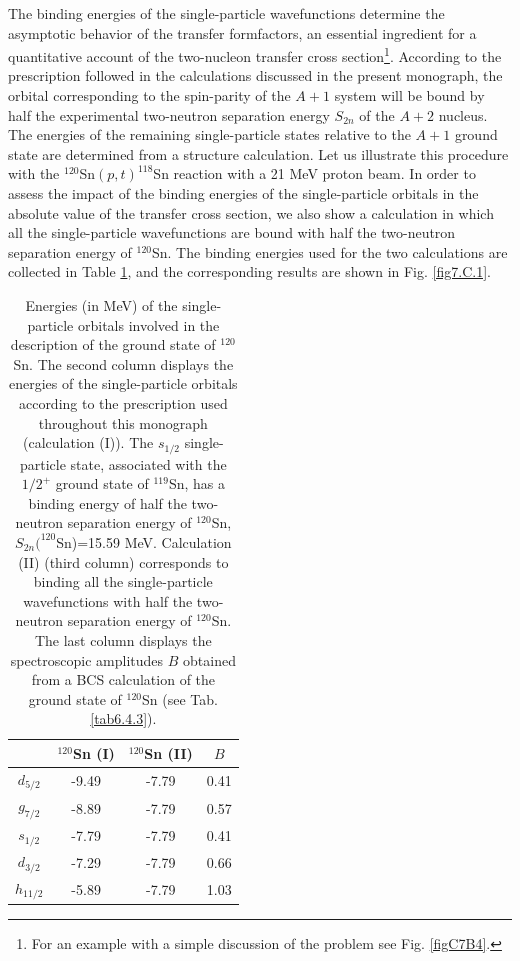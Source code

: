\begin{subappendices}
The binding energies of the single-particle wavefunctions  determine the asymptotic behavior of the transfer formfactors, an essential ingredient for a quantitative account of the two-nucleon transfer cross section\footnote{For an example with a simple discussion of the problem see Fig. \ref{figC7B4}.}. According to the prescription followed in the calculations discussed in the present monograph, the  orbital corresponding to the spin-parity of the  $A+1$ system will be  bound by half the experimental two-neutron separation energy $S_{2n}$   of the  $A+2$ nucleus.  The energies of the remaining single-particle states relative to the $A+1$ ground state are determined from a structure calculation. Let us illustrate this procedure with the $^{120}$Sn$(p,t)^{118}$Sn reaction with a 21 MeV proton beam. In order to assess the impact of the binding energies of the single-particle orbitals in the absolute value of the transfer cross section, we also show a calculation in which all the single-particle wavefunctions are bound with half the two-neutron separation energy of $^{120}$Sn. The binding energies used for the two calculations are collected in Table \ref{Tab7.C.1}, and the corresponding results are shown in Fig. \ref{fig7.C.1}.
\begin{table}
	\begin{center}
	\begin{tabular}{|c|c|c|c|} 
		\hline
		& $^{120}$Sn (I) & $^{120}$Sn (II) & $B$ \\
		\hline
	$d_{5/2}$	&  -9.49 &-7.79&0.41\\
	\hline
	$g_{7/2}$	&  -8.89&-7.79&0.57\\
	\hline
	$s_{1/2}$	&  -7.79&-7.79&0.41\\
	\hline
	$d_{3/2}$	&  -7.29&-7.79&0.66\\
	\hline
	$h_{11/2}$	& -5.89 &-7.79&1.03\\
	\hline
	\end{tabular}
\end{center}
	\caption{Energies (in MeV) of the single-particle orbitals involved in the description of the ground state of $^{120}$Sn. The second column displays the energies of the single-particle orbitals according to the prescription used throughout this monograph (calculation (I)). The $s_{1/2}$ single-particle state, associated with the $1/2^+$ ground state of $^{119}$Sn, has a binding energy of half the two-neutron separation energy of $^{120}$Sn, $S_{2n}(^{120}$Sn)=15.59 MeV. Calculation (II) (third column) corresponds to binding all the single-particle wavefunctions with half the two-neutron separation energy of $^{120}$Sn. The last column displays the spectroscopic amplitudes $B$ obtained from a BCS calculation of the ground state of $^{120}$Sn (see Tab. \ref{tab6.4.3}).}\label{Tab7.C.1}

\end{table}
\end{subappendices}
